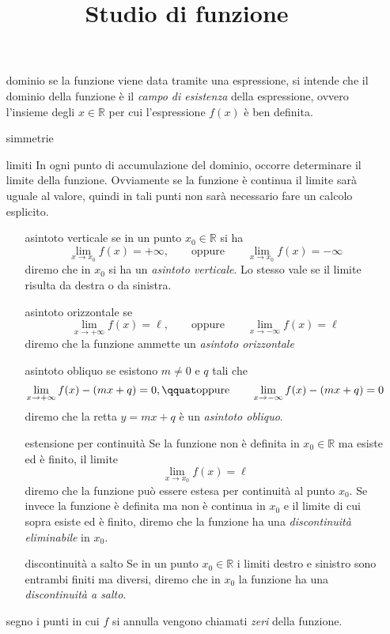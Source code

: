 \documentclass[italian,a4paper]{article}
\title{Studio di funzione}
\begin{document}
\begin{enumerate}

\item[dominio] se la funzione viene data tramite una espressione, si
  intende che il dominio della funzione è il \emph{campo di esistenza}
  della espressione, ovvero l'insieme degli $x\in \mathbb R$ per cui
  l'espressione $f(x)$ è ben definita.

\item[simmetrie]

\item[limiti]
  In ogni punto di accumulazione del dominio, occorre determinare il
  limite della funzione. Ovviamente se la funzione è continua il
  limite sarà uguale al valore, quindi in tali punti non sarà
  necessario fare un calcolo esplicito.
  \begin{enumerate}
  \item[asintoto verticale] se in un punto $x_0 \in \mathbb R$ si ha
    \[
    \lim_{x\to x_0} f(x) = +\infty,\qquad\text{oppure}\qquad
    \lim_{x\to x_0} f(x) = -\infty
    \]
    diremo che in $x_0$ si ha un \emph{asintoto verticale}. Lo stesso
    vale se il limite risulta da destra o da sinistra.
  \item[asintoto orizzontale] se
    \[
    \lim_{x\to +\infty} f(x) = \ell,\qquad\text{oppure}\qquad
    \lim_{x\to -\infty} f(x) = \ell
    \]
    diremo che la funzione ammette un \emph{asintoto orizzontale}
  \item[asintoto obliquo] se esistono $m\neq 0$ e $q$ tali che
    \[
    \lim_{x\to +\infty} f(x) - (mx+q) = 0,\qquat\text{oppure}\qquad
    \lim_{x\to -\infty} f(x) - (mx+q) = 0
    \]
    diremo che la retta $y=m x + q$ è un \emph{asintoto
      obliquo}.
  \item[estensione per continuità]
    Se la funzione non è definita in $x_0\in \mathbb R$ ma esiste ed è
    finito, il limite
    \[
    \lim_{x\to x_0} f(x) = \ell
    \]
    diremo che la funzione può essere estesa per continuità al punto
    $x_0$.
    Se invece la funzione è definita ma non è continua in $x_0$ e il
    limite di cui sopra esiste ed è finito, diremo che la funzione ha
    una \emph{discontinuità eliminabile} in $x_0$.
  \item[discontinuità a salto]
    Se in un punto $x_0\in \mathbb R$ i limiti destro e sinistro sono
    entrambi finiti ma diversi, diremo che in $x_0$ la funzione ha una
    \emph{discontinuità a salto}.
  \end{enumerate}

  \item[segno] i punti in cui $f$ si annulla vengono chiamati
    \emph{zeri} della funzione.


\end{enumerate}
\end{document}
